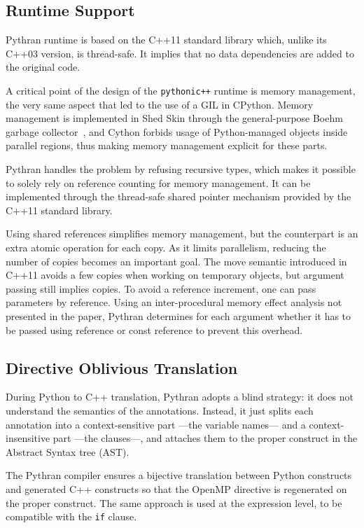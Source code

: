 \documentclass[conference]{IEEEtran}
\begin{document}
\subsection{Runtime Support}

Pythran runtime is based on the C++11 standard library which, unlike its C++03
version, is thread-safe. It implies that no data dependencies are added to the
original code.

A critical point of the design of the \texttt{pythonic++} runtime is memory
management, the very same aspect that led to the use of a GIL in CPython.
Memory management is implemented in Shed Skin through the general-purpose Boehm
garbage collector~\cite{boehm1991}, and Cython forbids usage of Python-managed
objects inside parallel regions, thus making memory management explicit for
these parts.

Pythran handles the problem by refusing recursive types, which makes it possible
to solely rely on reference counting for memory management. It can be
implemented through the thread-safe shared pointer mechanism provided by the
C++11 standard library.

Using shared references simplifies memory management, but the counterpart is an
extra atomic operation for each copy.
As it limits parallelism, reducing the number of copies becomes an important
goal.
The move semantic introduced in
C++11 avoids a few copies when working on temporary objects, but argument
passing still implies copies. To avoid a reference increment, one can pass
parameters by reference. Using an inter-procedural memory effect analysis not
presented in the paper, Pythran determines for each argument whether it has to
be passed using reference or const reference to prevent this overhead.

\subsection{Directive Oblivious Translation}

During Python to C++ translation, Pythran adopts a blind strategy: it does not
understand the semantics of the annotations. Instead, it just splits each
annotation into a context-sensitive part ---the variable names--- and a
context-insensitive part ---the clauses---, and attaches them to the proper
construct in the Abstract Syntax tree (AST).

The Pythran compiler ensures a bijective translation between Python constructs
and generated C++ constructs so that the OpenMP directive is regenerated on the
proper construct.
The same approach is used at the expression level, to be
compatible with the \texttt{if} clause.
\end{document}

